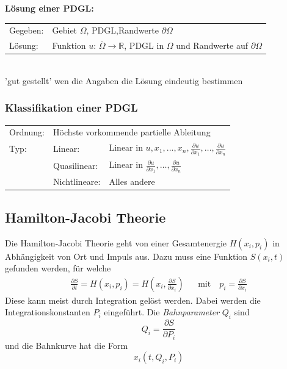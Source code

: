 \textbf{Lösung einer PDGL:}\\
\begin{tabular}{ll}
Gegeben:& Gebiet $\Omega$, PDGL,Randwerte $\partial\Omega$\\
Lösung:& Funktion $u$: $\overset{\_}{\Omega}\rightarrow \mathbb{R}$, PDGL in $\Omega$ und Randwerte auf $\partial\Omega$\\
\end{tabular} \\
'gut gestellt' wen die Angaben die Lösung eindeutig bestimmen

\subsubsection{Klassifikation einer PDGL}
\begin{tabular}{lll}
Ordnung:& \multicolumn{2}{l}{Höchste vorkommende partielle Ableitung}\\
Typ:& Linear: & Linear in $u, x_1,...,x_n, \frac{\partial u}{\partial x_1},\ldots,\frac{\partial u}{\partial x_n}$\\
& Quasilinear: &  Linear in $\frac{\partial u}{\partial x_1},\ldots,\frac{\partial u}{\partial x_n}$\\
& Nichtlineare: & Alles andere
\end{tabular}




\subsection{Hamilton-Jacobi Theorie}
Die Hamilton-Jacobi Theorie geht von einer Gesamtenergie $H(x_i,p_i)$ in Abhängigkeit von Ort
und Impuls aus.
Dazu muss eine Funktion $S(x_i,t)$ gefunden werden, für welche
\begin{align*}
    \frac{\partial S}{\partial t} = H\left(x_i,p_i\right) = H\left(x_i,\frac{\partial S}{\partial x_i}\right)
    && \text{mit} \quad
    p_i = \frac{\partial S}{\partial x_i}
\end{align*}
Diese kann meist durch Integration gelöst werden.
Dabei werden die Integrationskonstanten $P_i$ eingeführt.
Die \emph{Bahnparameter} $Q_i$ sind
\[
    Q_i = \frac{\partial S}{\partial P_i}
\]
und die Bahnkurve hat die Form
\[
    x_i(t,Q_i,P_i)
\]





%



